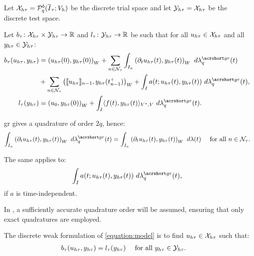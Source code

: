 \begin{definition}
    Let $\mathcal{X}_{h \tau} = \mathcal{P}_{q}^b(\overline{I}_{\tau}; V_h)$ be the discrete trial space and let $\mathcal{Y}_{h \tau} = \mathcal{X}_{h \tau}$ be the discrete test space.
\end{definition}

\begin{definition}
    Let $b_{\tau} \colon \mathcal{X}_{h \tau} \times \mathcal{Y}_{h \tau} \rightarrow \mathbb{R}$ and $l_{\tau} \colon \mathcal{Y}_{h \tau} \rightarrow \mathbb{R}$ be such that for all $u_{h \tau} \in \mathcal{X}_{h \tau}$ and all $y_{h \tau} \in \mathcal{Y}_{h \tau}$:
    \begin{align}
        b_{\tau}(u_{h \tau}, y_{h \tau}) & = \left( u_{h \tau}(0), y_{h \tau}(0) \right)_W + \sum_{n \in \TimeIndices} \int_{I_n} \left( \partial_t u_{h \tau}(t), y_{h \tau}(t) \right)_W ~ d \lambdaGR_q(t) \\
        & + \sum_{n \in \TimeIndices} \left( \llbracket u_{h \tau} \rrbracket_{n - 1}, y_{h \tau}(t_{n - 1}^+) \right)_W + \int_I a(t; u_{h \tau}(t), y_{h \tau}(t)) ~ d \lambdaGR_q(t), \notag \\
        l_{\tau}(y_{h \tau}) & = \left( u_0, y_{h \tau}(0) \right)_W + \int_I \langle f(t), y_{h \tau}(t) \rangle_{V^*, V} ~ d \lambdaGR_q(t).
    \end{align}
\end{definition}

\begin{remark}
    \acrshort{gr} gives a quadrature of order $2q$, hence:
    \begin{align}
        \int_{I_n} \left( \partial_t u_{h \tau}(t), y_{h \tau}(t) \right)_W ~ d \lambdaGR_q(t) &= \int_{I_n} \left( \partial_t u_{h \tau}(t), y_{h \tau}(t) \right)_W ~ d \lambda(t) &\text{ for all } n \in \TimeIndices.
    \end{align}
    
    The same applies to:
    \begin{align}
        \int_I a(t; u_{h \tau}(t), y_{h \tau}(t)) ~ d \lambdaGR_q(t),
    \end{align}
    if $a$ is time-independent.
\end{remark}
In , a sufficiently accurate quadrature order will be assumed, ensuring that only exact quadratures are employed.

\begin{definition}
    The discrete weak formulation of \cref{equation:model} is to find $u_{h \tau} \in \mathcal{X}_{h \tau}$ such that:
    \begin{align} \label{equation:weak_ht}
        b_{\tau}(u_{h \tau}, y_{h \tau}) &= l_{\tau}(y_{h \tau}) &\text{ for all } y_{h \tau} \in \mathcal{Y}_{h \tau}.
&    \end{align}
\end{definition}


